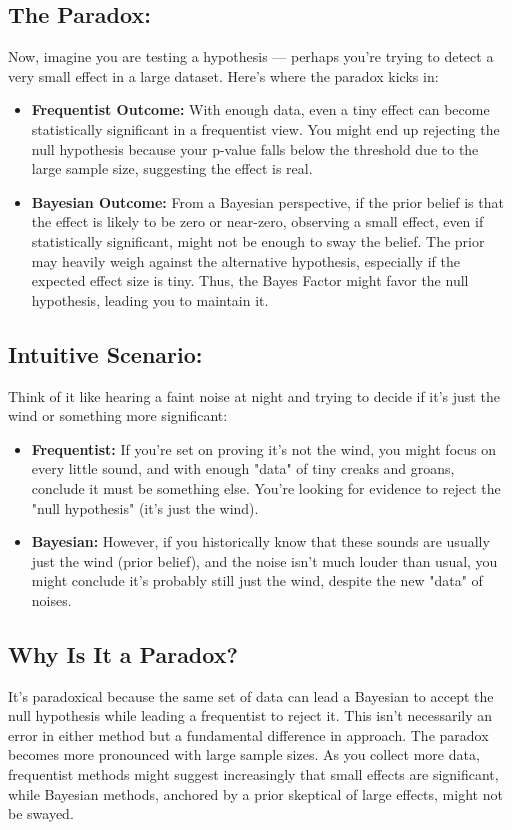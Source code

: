 \documentclass{article}
\begin{document}
\subsection*{The Paradox:}
Now, imagine you are testing a hypothesis — perhaps you're trying to detect a very small effect in a large dataset. Here's where the paradox kicks in:
\begin{itemize}
    \item \textbf{Frequentist Outcome:} With enough data, even a tiny effect can become statistically significant in a frequentist view. You might end up rejecting the null hypothesis because your p-value falls below the threshold due to the large sample size, suggesting the effect is real.
    \item \textbf{Bayesian Outcome:} From a Bayesian perspective, if the prior belief is that the effect is likely to be zero or near-zero, observing a small effect, even if statistically significant, might not be enough to sway the belief. The prior may heavily weigh against the alternative hypothesis, especially if the expected effect size is tiny. Thus, the Bayes Factor might favor the null hypothesis, leading you to maintain it.
\end{itemize}

\subsection*{Intuitive Scenario:}
Think of it like hearing a faint noise at night and trying to decide if it's just the wind or something more significant:
\begin{itemize}
    \item \textbf{Frequentist:} If you're set on proving it's not the wind, you might focus on every little sound, and with enough "data" of tiny creaks and groans, conclude it must be something else. You're looking for evidence to reject the "null hypothesis" (it's just the wind).
    \item \textbf{Bayesian:} However, if you historically know that these sounds are usually just the wind (prior belief), and the noise isn't much louder than usual, you might conclude it's probably still just the wind, despite the new "data" of noises.
\end{itemize}

\subsection*{Why Is It a Paradox?}
It's paradoxical because the same set of data can lead a Bayesian to accept the null hypothesis while leading a frequentist to reject it. This isn't necessarily an error in either method but a fundamental difference in approach. The paradox becomes more pronounced with large sample sizes. As you collect more data, frequentist methods might suggest increasingly that small effects are significant, while Bayesian methods, anchored by a prior skeptical of large effects, might not be swayed.
\end{document}
